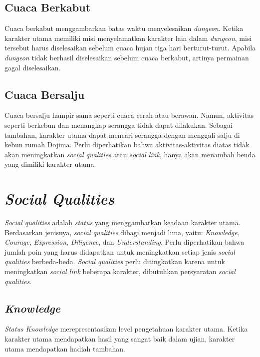 \subsection{Cuaca Berkabut}
Cuaca berkabut menggambarkan batas waktu menyelesaikan \textit{dungeon}. Ketika karakter utama memiliki misi menyelamatkan karakter lain dalam \textit{dungeon}, misi tersebut harus diselesaikan sebelum cuaca hujan tiga hari berturut-turut. Apabila \textit{dungeon} tidak berhasil diselesaikan sebelum cuaca berkabut, artinya permainan gagal diselesaikan.

\subsection{Cuaca Bersalju}
Cuaca bersalju hampir sama seperti cuaca cerah atau berawan. Namun, aktivitas seperti berkebun dan menangkap serangga tidak dapat dilakukan. Sebagai tambahan, karakter utama dapat mencari serangga dengan menggali salju di kebun rumah Dojima. Perlu diperhatikan bahwa aktivitas-aktivitas diatas tidak akan meningkatkan \textit{social qualities} atau \textit{social link}, hanya akan menambah benda yang dimiliki karakter utama.


\section{\textit{Social Qualities}}
\textit{Social qualities} adalah \textit{status} yang menggambarkan keadaan karakter utama. Berdasarkan jenisnya, \textit{social qualities} dibagi menjadi lima, yaitu: \textit{Knowledge}, \textit{Courage}, \textit{Expression}, \textit{Diligence}, dan \textit{Understanding}. Perlu diperhatikan bahwa jumlah poin yang harus didapatkan untuk meningkatkan setiap jenis \textit{social qualities} berbeda-beda. \textit{Social qualities} perlu ditingkatkan karena untuk meningkatkan \textit{social link} beberapa karakter, dibutuhkan persyaratan \textit{social qualities}.

\subsection{\textit{Knowledge}}
\textit{Status Knowledge} merepresentasikan level pengetahuan karakter utama. Ketika karakter utama mendapatkan hasil yang sangat baik dalam ujian, karakter utama mendapatkan hadiah tambahan.

